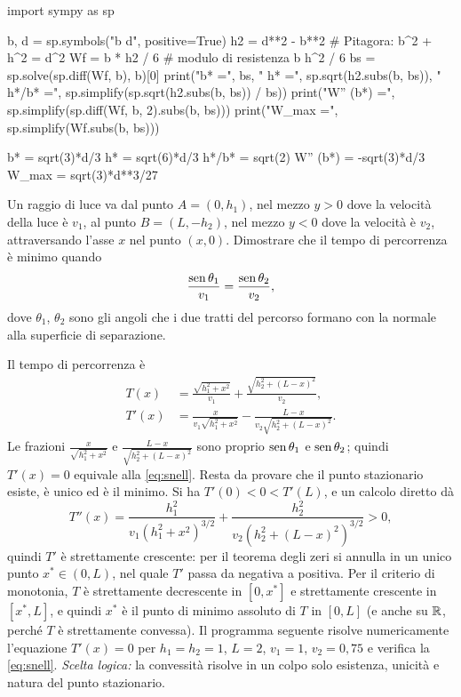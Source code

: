 \begin{python}
import sympy as sp

b, d = sp.symbols("b d", positive=True)
h2 = d**2 - b**2                  # Pitagora: b^2 + h^2 = d^2
Wf = b * h2 / 6                   # modulo di resistenza b h^2 / 6
bs = sp.solve(sp.diff(Wf, b), b)[0]
print("b* =", bs, "  h* =", sp.sqrt(h2.subs(b, bs)),
      "  h*/b* =", sp.simplify(sp.sqrt(h2.subs(b, bs)) / bs))
print("W'' (b*) =", sp.simplify(sp.diff(Wf, b, 2).subs(b, bs)))
print("W_max =", sp.simplify(Wf.subs(b, bs)))
\end{python}
\begin{risultato}
b* = sqrt(3)*d/3   h* = sqrt(6)*d/3   h*/b* = sqrt(2)
W'' (b*) = -sqrt(3)*d/3
W_max = sqrt(3)*d**3/27
\end{risultato}

\begin{esercizio}\label{es:snell}
Un raggio di luce va dal punto $A=(0,h_{1})$, nel mezzo $y>0$ dove la velocità della
luce è $v_{1}$, al punto $B=(L,-h_{2})$, nel mezzo $y<0$ dove la velocità è $v_{2}$,
attraversando l'asse $x$ nel punto $(x,0)$. Dimostrare che il tempo di percorrenza è
minimo quando
\begin{equation}\label{eq:snell}
  \frac{\operatorname{sen}\theta_{1}}{v_{1}}=\frac{\operatorname{sen}\theta_{2}}{v_{2}},
\end{equation}
dove $\theta_{1}$, $\theta_{2}$ sono gli angoli che i due tratti del percorso formano con
la normale alla superficie di separazione.
\begin{soluzione}
Il tempo di percorrenza è
\begin{align*}
  T(x)&=\frac{\sqrt{h_{1}^{2}+x^{2}}}{v_{1}}+\frac{\sqrt{h_{2}^{2}+(L-x)^{2}}}{v_{2}},\\
  T'(x)&=\frac{x}{v_{1}\sqrt{h_{1}^{2}+x^{2}}}-\frac{L-x}{v_{2}\sqrt{h_{2}^{2}+(L-x)^{2}}} .
\end{align*}
Le frazioni $\frac{x}{\sqrt{h_{1}^{2}+x^{2}}}$ e $\frac{L-x}{\sqrt{h_{2}^{2}+(L-x)^{2}}}$ sono
proprio $\operatorname{sen}\theta_{1}$ e $\operatorname{sen}\theta_{2}$; quindi $T'(x)=0$ equivale alla
\eqref{eq:snell}. Resta da provare che il punto stazionario esiste, è unico ed è il
minimo. Si ha $T'(0)<0<T'(L)$, e un calcolo diretto dà
\[
  T''(x)=\frac{h_{1}^{2}}{v_{1}(h_{1}^{2}+x^{2})^{3/2}}+\frac{h_{2}^{2}}{v_{2}(h_{2}^{2}+(L-x)^{2})^{3/2}}>0 ,
\]
quindi $T'$ è strettamente crescente: per il teorema degli zeri si annulla in un unico
punto $x^{*}\in(0,L)$, nel quale $T'$ passa da negativa a positiva. Per il criterio di
monotonia, $T$ è strettamente decrescente in $[0,x^{*}]$ e strettamente crescente in
$[x^{*},L]$, e quindi $x^{*}$ è il punto di minimo assoluto di $T$ in $[0,L]$ (e anche su $\mathbb{R}$,
perché $T$ è strettamente convessa). Il programma seguente risolve numericamente
l'equazione $T'(x)=0$ per $h_{1}=h_{2}=1$, $L=2$, $v_{1}=1$, $v_{2}=0{,}75$ e verifica la
\eqref{eq:snell}. \emph{Scelta logica:} la convessità risolve in un colpo solo
esistenza, unicità e natura del punto stazionario.
\end{soluzione}
\end{esercizio}

